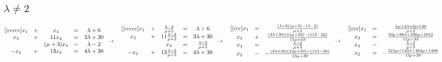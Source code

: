 \documentclass{article}
\begin{document}
    \subsection{\(\lambda \neq 2\)}
    \begin{math}
        \begin{matrix}[|ccccc]
            x_1 & + & x_4 & = & \lambda + 6\\
            x_3 & + & 11x_4 & = & 3\lambda + 30\\
            ~ & ~ & (\mu + 3)x_4 & = & \lambda - 2\\
            -x_2 & + & 13x_4 & = & 4\lambda + 38
        \end{matrix}\\
        \\
        \\
        \to\quad
        \begin{matrix}[|ccccc]
            x_1 & + & \frac{\lambda - 2}{\mu + 3} & = & \lambda + 6\\
            x_3 & + & 11\frac{\lambda - 2}{\mu + 3} & = & 3\lambda + 30\\
            ~ & ~ & x_4 & = & \frac{\lambda - 2}{\mu + 3}\\
            -x_2 & + & 13\frac{\lambda - 2}{\mu + 3} & = & 4\lambda + 38
        \end{matrix}\\
        \\
        \\
        \to\quad
        \begin{matrix}[|ccc]
            x_1 & = & \frac{(\lambda + 6)(\mu + 3) - (\lambda - 2)}{\mu + 3}\\
            x_3 & + & \frac{(3\lambda + 30)(11\mu + 33) - (11\lambda - 22)}{11\mu + 33}\\
            x_4 & = & \frac{\lambda - 2}{\mu + 3}\\
            x_2 & = & -\frac{(4\lambda + 38)(13\mu + 39) - (13\lambda - 26)}{13\mu + 39}
        \end{matrix}\\
        \\
        \\
        \to\quad
        \begin{matrix}[|ccc]
            x_1 & = & \frac{\lambda\mu + 2\lambda + 6\mu + 20}{\mu + 3}\\
            x_3 & = & \frac{33\mu + 88\lambda + 330\mu + 1012}{11\mu + 33}\\
            x_4 & = & \frac{\lambda - 2}{\mu + 3}\\
            x_2 & = & -\frac{52\lambda\mu + 143\lambda + 494\mu + 1498}{13\mu + 39}
        \end{matrix}
    \end{math}
\end{document}

